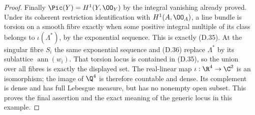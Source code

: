 \begin{proof}
Finally $\Pic(Y)=H^1(Y,\OO_Y)$ by the integral vanishing
already proved. Under its coherent restriction
identification with $H^1(A,\OO_A)$, a line bundle is
torsion on a smooth fibre exactly when some positive
integral multiple of its class belongs to
$\iota(\Lambda^*)$, by the exponential sequence.
This is exactly (D.35). At the singular fibre $S_i$
the same exponential sequence and (D.36) replace
$\Lambda^*$ by its sublattice $\operatorname{ann}(w_i)$.
That torsion locus is contained in (D.35), so the union
over all fibres is exactly the displayed set. The
real-linear map $\iota:\R^4\to\C^2$ is an isomorphism;
the image of $\Q^4$ is therefore countable and dense.
Its complement is dense and has full Lebesgue measure,
but has no nonempty open subset. This proves the final
assertion and the exact meaning of the generic locus
in this example.
\end{proof}

